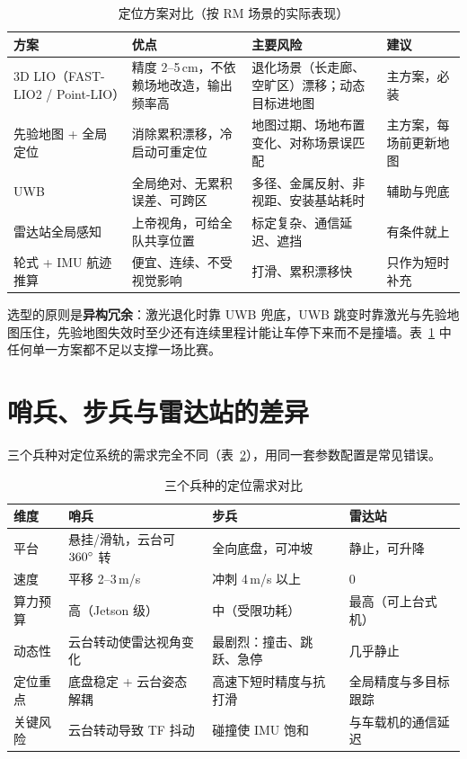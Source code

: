 \begin{table}[htbp]
  \centering
  \caption{定位方案对比（按 RM 场景的实际表现）}\label{tab:29-scheme}
  \footnotesize
  \begin{tabular}{p{2.6cm}p{4.4cm}p{4.6cm}p{2.4cm}}
    \toprule
    方案 & 优点 & 主要风险 & 建议 \\
    \midrule
    3D LIO（FAST-LIO2 / Point-LIO） & 精度 2--5\,cm，不依赖场地改造，输出频率高 & 退化场景（长走廊、空旷区）漂移；动态目标进地图 & 主方案，必装 \\
    先验地图 + 全局定位 & 消除累积漂移，冷启动可重定位 & 地图过期、场地布置变化、对称场景误匹配 & 主方案，每场前更新地图 \\
    UWB & 全局绝对、无累积误差、可跨区 & 多径、金属反射、非视距、安装基站耗时 & 辅助与兜底 \\
    雷达站全局感知 & 上帝视角，可给全队共享位置 & 标定复杂、通信延迟、遮挡 & 有条件就上 \\
    轮式 + IMU 航迹推算 & 便宜、连续、不受视觉影响 & 打滑、累积漂移快 & 只作为短时补充 \\
    \bottomrule
  \end{tabular}
\end{table}

选型的原则是\textbf{异构冗余}：激光退化时靠 UWB 兜底，UWB 跳变时靠激光与先验地图压住，先验地图失效时至少还有连续里程计能让车停下来而不是撞墙。表~\ref{tab:29-scheme} 中任何单一方案都不足以支撑一场比赛。

\section{哨兵、步兵与雷达站的差异}\label{sec:29-platform}

三个兵种对定位系统的需求完全不同（表~\ref{tab:29-platform}），用同一套参数配置是常见错误。

\begin{table}[htbp]
  \centering
  \caption{三个兵种的定位需求对比}\label{tab:29-platform}
  \footnotesize
  \begin{tabular}{p{2.0cm}p{3.2cm}p{3.2cm}p{3.2cm}}
    \toprule
    维度 & 哨兵 & 步兵 & 雷达站 \\
    \midrule
    平台 & 悬挂/滑轨，云台可 $360^\circ$ 转 & 全向底盘，可冲坡 & 静止，可升降 \\
    速度 & 平移 2--3\,m/s & 冲刺 4\,m/s 以上 & 0 \\
    算力预算 & 高（Jetson 级） & 中（受限功耗） & 最高（可上台式机） \\
    动态性 & 云台转动使雷达视角变化 & 最剧烈：撞击、跳跃、急停 & 几乎静止 \\
    定位重点 & 底盘稳定 + 云台姿态解耦 & 高速下短时精度与抗打滑 & 全局精度与多目标跟踪 \\
    关键风险 & 云台转动导致 TF 抖动 & 碰撞使 IMU 饱和 & 与车载机的通信延迟 \\
    \bottomrule
  \end{tabular}
\end{table}

